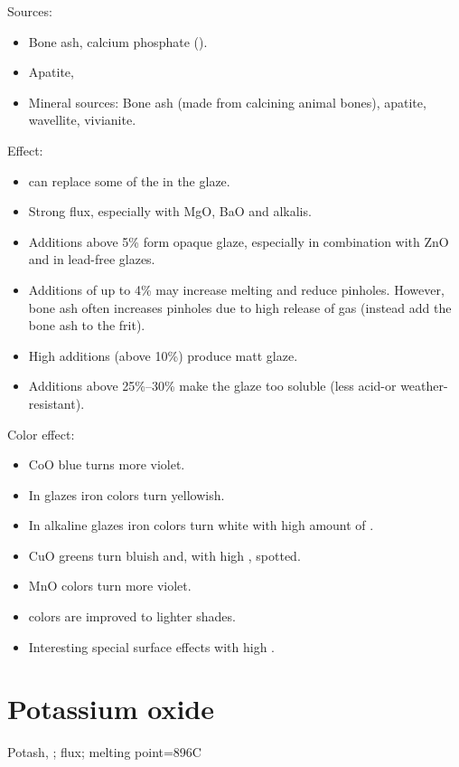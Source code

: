 Sources:
\begin{itemize}
  \item Bone ash, calcium phosphate ().
  \item Apatite, 
  \item Mineral sources: Bone ash (made from calcining animal bones), apatite, 
  wavellite, vivianite.
\end{itemize}
Effect:
\begin{itemize}
  \item {} can replace some of the  in the glaze.
  \item Strong flux, especially with MgO, BaO and alkalis.
  \item Additions above 5\% form opaque glaze, especially in combination with 
  ZnO and in lead-free glazes.
  \item Additions of up to 4\% may increase melting and reduce pinholes. 
  However, bone ash often increases pinholes due to high release of gas 
  (instead add the bone ash to the frit).
  \item High additions (above 10\%) produce matt glaze.
  \item Additions above 25\%--30\% make the glaze too soluble (less acid-or 
  weather-resistant).
\end{itemize}
Color effect:
\begin{itemize}
  \item CoO blue turns more violet.
  \item In  glazes iron colors turn yellowish.
  \item In alkaline glazes iron colors turn white with high amount of .
  \item CuO greens turn bluish and, with high , spotted.
  \item MnO colors turn more violet.
  \item {} colors are improved to lighter shades.
  \item Interesting special surface effects with high .
\end{itemize}
\section{Potassium oxide}
Potash, ; flux; melting point=896\degree C

